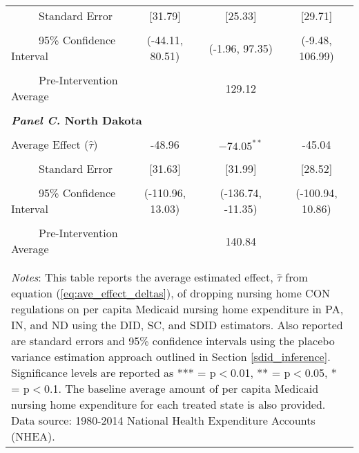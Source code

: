 \documentclass[../Main.tex]{subfiles}
\begin{document}
\begin{table}[htbp]
\begin{tabular}{l*{3}{c}}
\\[-2ex]
\multicolumn{1}{l}{\ \ \ \ \ Standard Error}  &\multicolumn{1}{c}{[31.79]}&\multicolumn{1}{c}{[25.33]}&\multicolumn{1}{c}{[29.71]}\\
\\[-2ex]
\multicolumn{1}{l}{\ \ \ \ \ 95\% Confidence Interval}&   \multicolumn{1}{c}{(-44.11, 80.51)}&   \multicolumn{1}{c}{(-1.96, 97.35)}&   \multicolumn{1}{c}{(-9.48, 106.99)}\\
\\[-2ex]
\multicolumn{1}{l}{\ \ \ \ \ Pre-Intervention Average}&   \multicolumn{3}{c}{129.12}\\
\\[-.1ex]
\multicolumn{4}{l}{\textbf{\textit{Panel C.} North Dakota}}\\
\\[-1.5ex]
\multicolumn{1}{l}{Average Effect ($\hat{\tau}$)}&   \multicolumn{1}{c}{-48.96} &   \multicolumn{1}{c}{$-74.05^{**}$}&  \multicolumn{1}{c}{-45.04}\\
\\[-2ex]
\multicolumn{1}{l}{\ \ \ \ \ Standard Error}  &\multicolumn{1}{c}{[31.63]}&\multicolumn{1}{c}{[31.99]}&\multicolumn{1}{c}{[28.52]}\\
\\[-2ex]
\multicolumn{1}{l}{\ \ \ \ \ 95\% Confidence Interval}&   \multicolumn{1}{c}{(-110.96, 13.03)}&   \multicolumn{1}{c}{(-136.74, -11.35)}&   \multicolumn{1}{c}{(-100.94, 10.86)}\\
\\[-2ex]
\multicolumn{1}{l}{\ \ \ \ \ Pre-Intervention Average}&   \multicolumn{3}{c}{140.84}\\
\\[-.1ex]
\hline\hline
\\[-2ex]
\multicolumn{4}{p{.8\linewidth}}{\footnotesize \textit{Notes}: This table reports the average estimated effect, $\hat{\tau}$ from equation (\ref{eq:ave_effect_deltas}), of dropping nursing home CON regulations on per capita Medicaid nursing home expenditure in PA, IN, and ND using the DID, SC, and SDID estimators. Also reported are standard errors and 95\% confidence intervals using the placebo variance estimation approach outlined in Section \ref{sdid_inference}. Significance levels are reported as *** = p$<$0.01, ** = p$<$0.05, * = p$<$0.1. The baseline average amount of per capita Medicaid nursing home expenditure for each treated state is also provided. Data source: 1980-2014 National Health Expenditure Accounts (NHEA).}
\end{tabular}
\end{table}
\vfill
\clearpage
\end{document}
